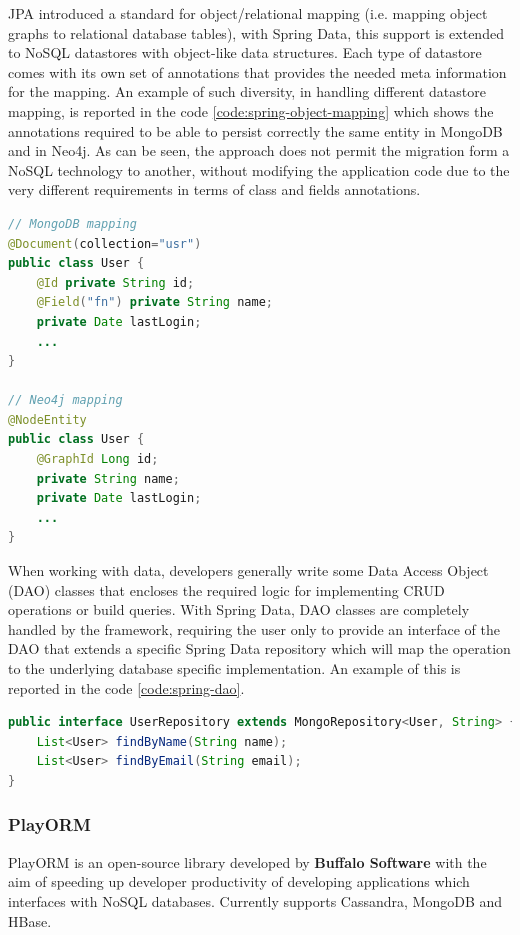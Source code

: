 \noindent JPA introduced a standard for object/relational mapping (i.e. mapping object graphs to relational database tables), with Spring Data, this support is extended to NoSQL datastores with object-like data structures.
Each type of datastore comes with its own set of annotations that provides the needed meta information for the mapping. An example of such diversity, in handling different datastore mapping, is reported in the code \ref{code:spring-object-mapping} which shows the annotations required to be able to persist correctly the same entity in MongoDB and in Neo4j. As can be seen, the approach does not permit the migration form a NoSQL technology to another, without modifying the application code due to the very different requirements in terms of class and fields annotations.

\begin{lstlisting}[language=Java, caption=Spring Data object mapping, label=code:spring-object-mapping]
// MongoDB mapping
@Document(collection="usr")
public class User {
    @Id private String id;
    @Field("fn") private String name;
    private Date lastLogin;
    ...
}

// Neo4j mapping
@NodeEntity
public class User {
    @GraphId Long id;
    private String name;
    private Date lastLogin;
    ...
}
\end{lstlisting}

\noindent When working with data, developers generally write some Data Access Object (DAO) classes that encloses the required logic for implementing CRUD operations or build queries.
With Spring Data, DAO classes are completely handled by the framework, requiring the user only to provide an interface of the DAO that extends a specific Spring Data repository which will map the operation to the underlying database specific implementation.
An example of this is reported in the code \ref{code:spring-dao}.

\begin{lstlisting}[language=Java, caption=Spring Data repositories, label=code:spring-dao]
public interface UserRepository extends MongoRepository<User, String> {
    List<User> findByName(String name);
    List<User> findByEmail(String email);
}
\end{lstlisting}

\subsubsection{PlayORM}
PlayORM \cite{online:playorm} is an open-source library developed by \textbf{Buffalo Software} with the aim of speeding up developer productivity of developing applications which interfaces with NoSQL databases. Currently supports Cassandra, MongoDB and HBase. 

